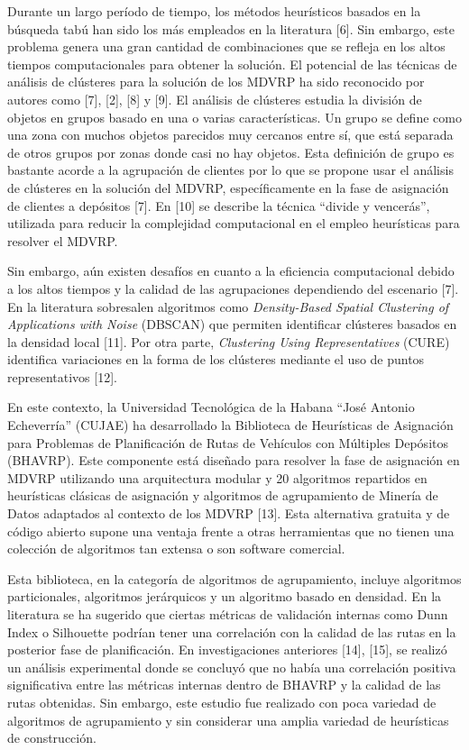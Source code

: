 Durante un largo per\'iodo de tiempo, los m\'etodos heur\'isticos basados en la b\'usqueda tab\'u han sido los m\'as empleados en la literatura [6]. Sin embargo, este problema genera una gran cantidad de combinaciones que se refleja en los altos tiempos computacionales para obtener la soluci\'on. El potencial de las t\'ecnicas de an\'alisis de cl\'usteres para la soluci\'on de los MDVRP ha sido reconocido por autores como [7], [2], [8] y [9]. El an\'alisis de cl\'usteres estudia la divisi\'on de objetos en grupos basado en una o varias caracter\'isticas. Un grupo se define como una zona con muchos objetos parecidos muy cercanos entre s\'i, que est\'a separada de otros grupos por zonas donde casi no hay objetos. Esta definici\'on de grupo es bastante acorde a la agrupaci\'on de clientes por lo que se propone usar el an\'alisis de cl\'usteres en la soluci\'on del MDVRP, espec\'ificamente en la fase de asignaci\'on de clientes a dep\'ositos [7]. En [10] se describe la t\'ecnica ``divide y vencer\'as'', utilizada para reducir la complejidad computacional en el empleo heur\'isticas para resolver el MDVRP.

Sin embargo, a\'un existen desaf\'ios en cuanto a la eficiencia computacional debido a los altos tiempos y la calidad de las agrupaciones dependiendo del escenario [7]. En la literatura sobresalen algoritmos como \textit{Density-Based Spatial Clustering of Applications with Noise} (DBSCAN) que permiten identificar cl\'usteres basados en la densidad local [11]. Por otra parte, \textit{Clustering Using Representatives} (CURE) identifica variaciones en la forma de los cl\'usteres mediante el uso de puntos representativos [12].

En este contexto, la Universidad Tecnol\'ogica de la Habana ``Jos\'e Antonio Echeverr\'ia'' (CUJAE) ha desarrollado la Biblioteca de Heur\'isticas de Asignaci\'on para Problemas de Planificaci\'on de Rutas de Veh\'iculos con M\'ultiples Dep\'ositos (BHAVRP). Este componente est\'a dise\~nado para resolver la fase de asignaci\'on en MDVRP utilizando una arquitectura modular y 20 algoritmos repartidos en heur\'isticas cl\'asicas de asignaci\'on y algoritmos de agrupamiento de Miner\'ia de Datos adaptados al contexto de los MDVRP [13]. Esta alternativa gratuita y de c\'odigo abierto supone una ventaja frente a otras herramientas que no tienen una colecci\'on de algoritmos tan extensa o son software comercial.

Esta biblioteca, en la categor\'ia de algoritmos de agrupamiento, incluye algoritmos particionales, algoritmos jer\'arquicos y un algoritmo basado en densidad. En la literatura se ha sugerido que ciertas m\'etricas de validaci\'on internas como Dunn Index o Silhouette podr\'ian tener una correlaci\'on con la calidad de las rutas en la posterior fase de planificaci\'on. En investigaciones anteriores [14], [15], se realiz\'o un an\'alisis experimental donde se concluy\'o que no hab\'ia una correlaci\'on positiva significativa entre las m\'etricas internas dentro de BHAVRP y la calidad de las rutas obtenidas. Sin embargo, este estudio fue realizado con poca variedad de algoritmos de agrupamiento y sin considerar una amplia variedad de heur\'isticas de construcci\'on.

